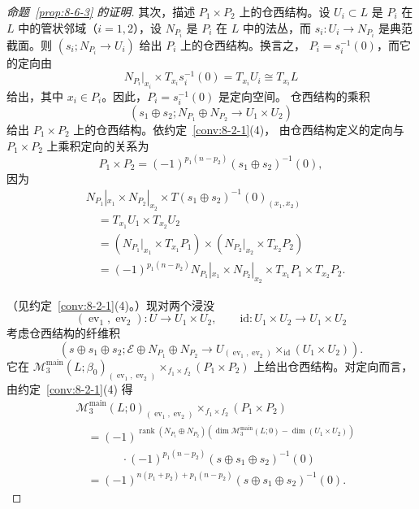 \begin{proof}[命题~\ref{prop:8-6-3} 的证明]
其次，描述 $P_1\times P_2$ 上的仓西结构。设
$U_i\subset L$ 是 $P_i$ 在 $L$ 中的管状邻域（$i=1,2$），设
$N_{P_i}$ 是 $P_i$ 在 $L$ 中的法丛，而
$s_i\colon U_i\to N_{P_i}$ 是典范截面。则
$(s_i;N_{P_i}\to U_i)$ 给出 $P_i$ 上的仓西结构。换言之，
$P_i=s_i^{-1}(0)$，而它的定向由
\[
 N_{P_i}|_{x_i}\times T_{x_i}s_i^{-1}(0)
 =T_{x_i}U_i\cong T_{x_i}L
\]
给出，其中 $x_i\in P_i$。因此，$P_i=s_i^{-1}(0)$ 是定向空间。
仓西结构的乘积
\[
 (s_1\oplus s_2;N_{P_1}\oplus N_{P_2}\longrightarrow U_1\times U_2)
\]
给出 $P_1\times P_2$ 上的仓西结构。依约定~\ref{conv:8-2-1}(4)，
由仓西结构定义的定向与 $P_1\times P_2$ 上乘积定向的关系为
\[
 P_1\times P_2=(-1)^{p_1(n-p_2)}(s_1\oplus s_2)^{-1}(0),
\]
因为
\[
\begin{aligned}
 &N_{P_1}|_{x_1}\times N_{P_2}|_{x_2}
 \times T(s_1\oplus s_2)^{-1}(0)_{(x_1,x_2)}\\
 &\quad=T_{x_1}U_1\times T_{x_2}U_2\\
 &\quad=(N_{P_1}|_{x_1}\times T_{x_1}P_1)
 \times(N_{P_2}|_{x_2}\times T_{x_2}P_2)\\
 &\quad=(-1)^{p_1(n-p_2)}
 N_{P_1}|_{x_1}\times N_{P_2}|_{x_2}
 \times T_{x_1}P_1\times T_{x_2}P_2.
\end{aligned}
\]

（见约定~\ref{conv:8-2-1}(4)。）现对两个浸没
\[
 (\operatorname{ev}_1,\operatorname{ev}_2)\colon U\to U_1\times U_2,
 \qquad
 \mathrm{id}\colon U_1\times U_2\to U_1\times U_2
\]
考虑仓西结构的纤维积
\[
 \left(s\oplus s_1\oplus s_2;
 \mathcal E\oplus N_{P_1}\oplus N_{P_2}
 \longrightarrow
 U_{(\operatorname{ev}_1,\operatorname{ev}_2)}
 \mathop{\times}_{\mathrm{id}}(U_1\times U_2)\right).
\]
它在
$\mathcal M_3^{\mathrm{main}}(L;\beta_0)_{
(\operatorname{ev}_1,\operatorname{ev}_2)}
\mathop{\times}_{f_1\times f_2}(P_1\times P_2)$
上给出仓西结构。对定向而言，由约定~\ref{conv:8-2-1}(4)
得
\begin{equation}
\begin{aligned}
 &\mathcal M_3^{\mathrm{main}}(L;0)_{
 (\operatorname{ev}_1,\operatorname{ev}_2)}
 \mathop{\times}_{f_1\times f_2}(P_1\times P_2)\\
 &\quad=(-1)^{\operatorname{rank}(N_{P_1}\oplus N_{P_2})
 (\dim\mathcal M_3^{\mathrm{main}}(L;0)-\dim(U_1\times U_2))}\\[-2pt]
 &\qquad\qquad{}·(-1)^{p_1(n-p_2)}
 (s\oplus s_1\oplus s_2)^{-1}(0)\\
 &\quad=(-1)^{n(p_1+p_2)+p_1(n-p_2)}
 (s\oplus s_1\oplus s_2)^{-1}(0).
\end{aligned}
\tag{8.6.5}\label{eq:8-6-5}
\end{equation}


\end{proof}
